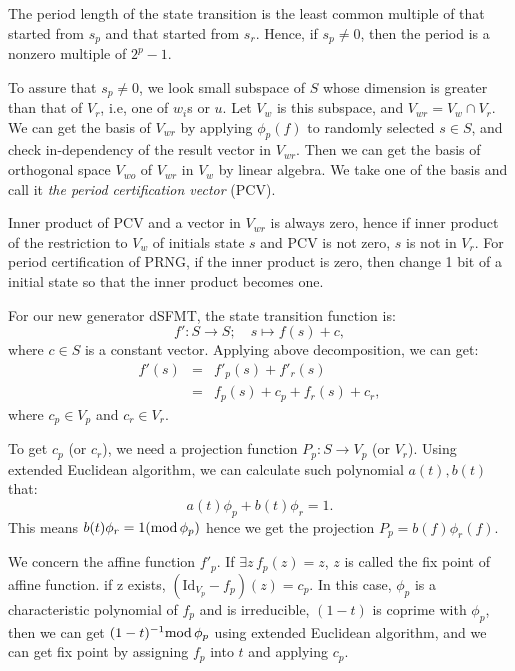 \documentclass{svmult}
\begin{document}

The period length of the state transition is the least common multiple
of that started from $s_p$ and that started from $s_r$. Hence, 
if $s_p \neq 0$, then the period is a nonzero multiple of $2^p-1$.

To assure that $s_p \neq 0$, we look small subspace of $S$ whose
dimension is greater than that of $V_r$, i.e, one of $w_i$s or $u$.
Let $V_w$ is this subspace, and $V_{wr} = V_w \cap V_r$.  We can get
the basis of $V_{wr}$ by applying $\phi_p(f)$ to randomly selected $s
\in S$, and check in-dependency of the result vector in $V_{wr}$. Then
we can get the basis of orthogonal space $V_{wo}$ of $V_{wr}$ in $V_w$
by linear algebra. We take one of the basis and call it {\em the
  period certification vector} (PCV).

Inner product of PCV and a vector in $V_{wr}$ is always zero,
hence if inner product of the restriction to $V_w$ of initials state $s$
and PCV is not zero, $s$ is not in $V_r$. For period certification of
PRNG, if the inner product is zero, then change 1 bit of a initial state
so that the inner product becomes one.

For our new generator dSFMT, the state transition function is:
\[
  f': S \to S ; \quad s \mapsto f(s) + c,
\]
where $c \in S$ is a constant vector.  Applying above decomposition,
we can get:
\begin{eqnarray*}
  f'(s) &=& f'_p(s) + f'_r(s) \\
  &=&f_p(s) + c_p + f_r(s) + c_r,
\end{eqnarray*}
where $c_p \in V_p$ and $c_r \in V_r$.

To get $c_p$ (or $c_r$), we need a projection function $P_p: S \to
V_p$ (or $V_r$). Using extended Euclidean algorithm, we can
calculate such polynomial $a(t), b(t)$ that:
\[
a(t)\phi_p + b(t)\phi_r = 1.
\]
This means $b(t)\phi_r = 1 (\textrm{mod}\, \phi_p)$ hence we get the projection
$P_p = b(f)\phi_r(f).$

We concern the affine function $f'_p$. If $\exists z\, f_p(z) = z$,
$z$ is called the fix point of affine function. if z exists, 
$(\textrm{Id}_{V_p} - f_p)(z) = c_p$. In this case,
$\phi_p$ is a characteristic polynomial of $f_p$ and is irreducible,
$(1 - t)$ is coprime with $\phi_p$, then we can get $(1 - t)^{-1} \textrm{mod}\, 
\phi_p$ using extended Euclidean algorithm, and we can get fix point
by assigning $f_p$ into $t$ and applying $c_p.$
\end{document}
